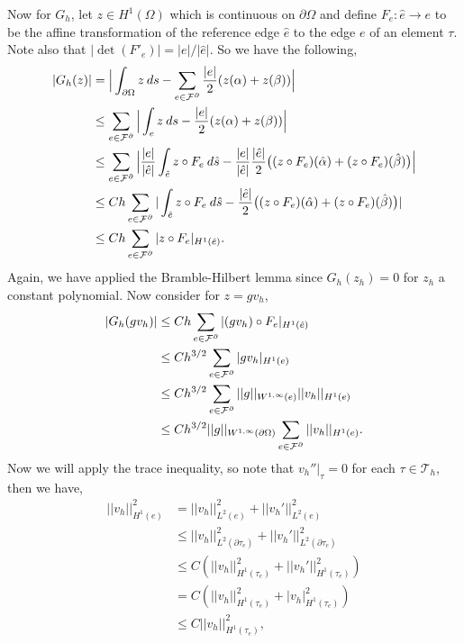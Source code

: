 \documentclass[11pt]{article}
\begin{document}
Now for $G_h$, let $z \in H^1(\Omega)$ which is continuous on $\partial \Omega$ and define $F_e : \hat{e} \to e$ to be the affine transformation of the reference edge $\hat{e}$ to the edge $e$ of an element $\tau$.
Note also that $|\det (F'_e)| = |e|/|\hat{e}|$.
So we have the following,
\begin{align*}
    |G_h(z)| &= \Big| \int_{\partial \Omega} z \: ds - \sum_{e \in \mathcal{F}^\partial} \frac{|e|}{2}(z(\alpha) + z(\beta)) \Big| \\
    &\leq  \sum_{e \in \mathcal{F}^\partial} \Big| \int_e z \: ds - \frac{|e|}{2}(z(\alpha) + z(\beta)) \Big| \\
    &\leq \sum_{e \in \mathcal{F}^\partial} \Big| \frac{|e|}{|\Hat{e}|} \int_{\Hat{e}} z\circ F_e \: d\Hat{s} - \frac{|e|}{|\Hat{e}|}\frac{|\Hat{e}|}{2} \big((z\circ F_e)(\Hat{\alpha}) + (z\circ F_e)(\Hat{\beta})\big) \Big| \\
    &\leq Ch \sum_{e \in \mathcal{F}^\partial} | \int_{\Hat{e}} z\circ F_e \: d\Hat{s} - \frac{|\Hat{e}|}{2}\big((z\circ F_e)(\Hat{\alpha}) + (z\circ F_e)(\Hat{\beta}) \big)| \\
    &\leq Ch \sum_{e \in \mathcal{F}^\partial} |z\circ F_e|_{H^1(\Hat{e})}.
\end{align*}
Again, we have applied the Bramble-Hilbert lemma since $G_h(z_h) = 0$ for $z_h$ a constant polynomial. 
Now consider for $z = g v_h$,
\begin{align*}
    |G_h(g v_h)| &\leq Ch \sum_{e \in \mathcal{F}^\partial} |(gv_h)\circ F_e|_{H^1(\Hat{e})} \\
    &\leq Ch^{3/2} \sum_{e \in \mathcal{F}^\partial} |g v_h|_{H^1(e)} \\
    &\leq Ch^{3/2} \sum_{e \in \mathcal{F}^\partial} ||g||_{W^{1,\infty}(e)} ||v_h||_{H^1(e)} \\
    &\leq Ch^{3/2} ||g||_{W^{1,\infty}(\partial \Omega)} \sum_{e \in \mathcal{F}^\partial} ||v_h||_{H^1(e)}.
\end{align*}
Now we will apply the trace inequality, so note that $v_h''|_{\tau} = 0$ for each $\tau \in \mathcal{T}_h$, then we have,
\begin{align*}
    ||v_h||^2_{H^1(e)} &= ||v_h||^2_{L^2(e)} + ||v_h'||^2_{L^2(e)} \\
    &\leq ||v_h||^2_{L^2(\partial \tau_e)} + ||v_h'||^2_{L^2(\partial \tau_e)} \\
    &\leq C ( ||v_h||^2_{H^1(\tau_e)} + ||v_h'||^2_{H^1(\tau_e)} ) \\
    &= C ( ||v_h||^2_{H^1(\tau_e)} + |v_h|^2_{H^1(\tau_e)} ) \\
    &\leq C||v_h||^2_{H^1(\tau_e)},
\end{align*}
\end{document}
